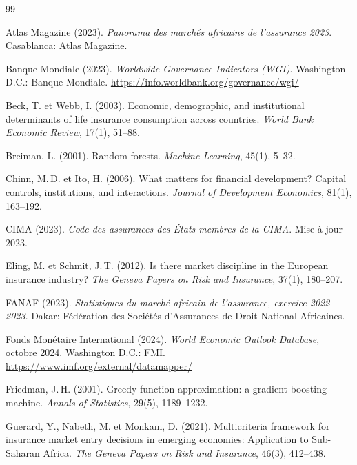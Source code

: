 \documentclass[12pt,a4paper]{report}
\begin{document}
\begin{thebibliography}{99}

Atlas Magazine (2023).
\newblock \emph{Panorama des marchés africains de l'assurance 2023}.
\newblock Casablanca: Atlas Magazine.

Banque Mondiale (2023).
\newblock \emph{Worldwide Governance Indicators (WGI)}.
\newblock Washington D.C.: Banque Mondiale.
\newblock \url{https://info.worldbank.org/governance/wgi/}

Beck, T. et Webb, I. (2003).
\newblock Economic, demographic, and institutional determinants of life insurance
  consumption across countries.
\newblock \emph{World Bank Economic Review}, 17(1), 51--88.

Breiman, L. (2001).
\newblock Random forests.
\newblock \emph{Machine Learning}, 45(1), 5--32.

Chinn, M.\,D. et Ito, H. (2006).
\newblock What matters for financial development? Capital controls, institutions,
  and interactions.
\newblock \emph{Journal of Development Economics}, 81(1), 163--192.

CIMA (2023).
\newblock \emph{Code des assurances des États membres de la CIMA}.
\newblock Mise à jour 2023.

Eling, M. et Schmit, J.\,T. (2012).
\newblock Is there market discipline in the European insurance industry?
\newblock \emph{The Geneva Papers on Risk and Insurance}, 37(1), 180--207.

FANAF (2023).
\newblock \emph{Statistiques du marché africain de l'assurance, exercice 2022--2023}.
\newblock Dakar: Fédération des Sociétés d'Assurances de Droit National Africaines.

Fonds Monétaire International (2024).
\newblock \emph{World Economic Outlook Database}, octobre 2024.
\newblock Washington D.C.: FMI.
\newblock \url{https://www.imf.org/external/datamapper/}

Friedman, J.\,H. (2001).
\newblock Greedy function approximation: a gradient boosting machine.
\newblock \emph{Annals of Statistics}, 29(5), 1189--1232.

Guerard, Y., Nabeth, M. et Monkam, D. (2021).
\newblock Multicriteria framework for insurance market entry decisions in emerging
  economies: Application to Sub-Saharan Africa.
\newblock \emph{The Geneva Papers on Risk and Insurance}, 46(3), 412--438.


\end{thebibliography}
\end{document}
